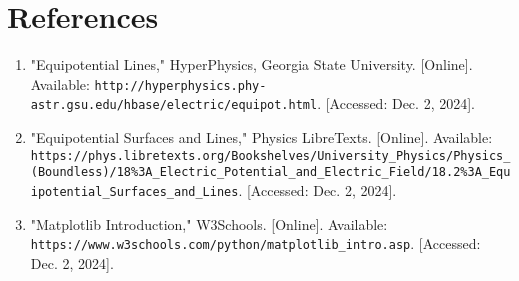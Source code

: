 \documentclass[conference]{IEEEtran}
\begin{document}
\section*{References}
\begin{enumerate}
    \item "Equipotential Lines," HyperPhysics, Georgia State University. [Online]. Available: \texttt{http://hyperphysics.phy-astr.gsu.edu/hbase/electric/equipot.html}. [Accessed: Dec. 2, 2024].
    \item "Equipotential Surfaces and Lines," Physics LibreTexts. [Online]. Available: \texttt{https://phys.libretexts.org/Bookshelves/University\_Physics/Physics\_(Boundless)/18\%3A\_Electric\_Potential\_and\_Electric\_Field/18.2\%3A\_Equipotential\_Surfaces\_and\_Lines}. [Accessed: Dec. 2, 2024].
    \item "Matplotlib Introduction," W3Schools. [Online]. Available: \texttt{https://www.w3schools.com/python/matplotlib\_intro.asp}. [Accessed: Dec. 2, 2024].
\end{enumerate}
\end{document}
